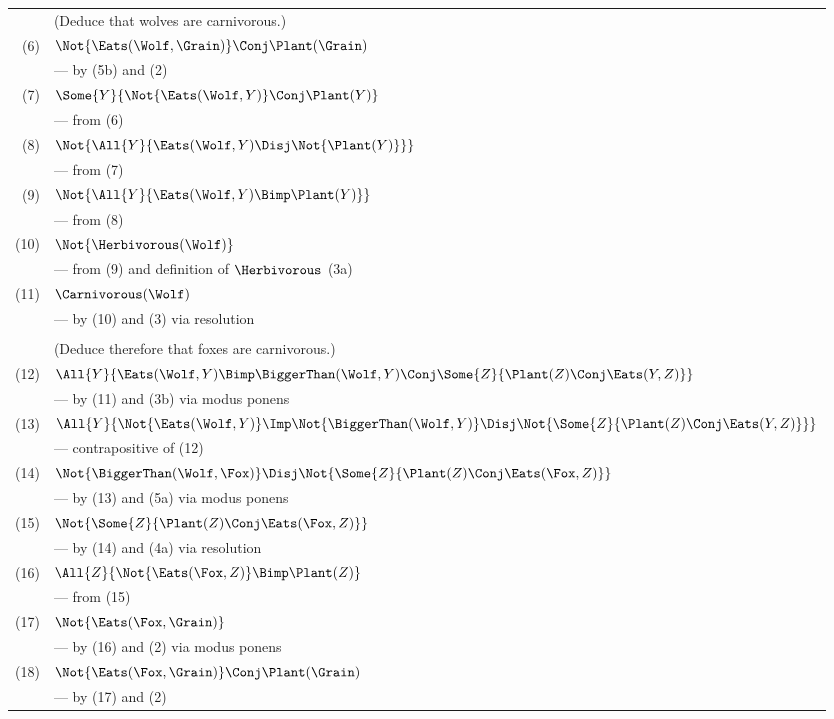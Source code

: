 \begin{itemize}
\begin{tabular}{rl}
& (Deduce that wolves are carnivorous.) \\
(6) & $\Not{\Eats(\Wolf, \Grain)} \Conj \Plant(\Grain)$
\\ & --- by (5b) and (2) \\
(7) & $\Some{Y}{\Not{\Eats(\Wolf, Y)} \Conj \Plant(Y)}$
\\ & --- from (6) \\
(8) & $\Not{\All{Y}{\Eats(\Wolf, Y) \Disj \Not{\Plant(Y)}}}$
\\ & --- from (7) \\
(9) & $\Not{\All{Y}{\Eats(\Wolf, Y) \Bimp \Plant(Y)}}$
\\ & --- from (8) \\
(10) & $\Not{\Herbivorous(\Wolf)}$
\\ & --- from (9) and definition of $\Herbivorous$ (3a) \\
(11) & $\Carnivorous(\Wolf)$
\\ & --- by (10) and (3) via resolution \\
\\
& (Deduce therefore that foxes are carnivorous.) \\
(12) & $\All{Y}{\Eats(\Wolf, Y) \Bimp
            \BiggerThan(\Wolf, Y) \Conj
            \Some{Z}{\Plant(Z) \Conj \Eats(Y, Z)}}$
\\ & --- by (11) and (3b) via modus ponens \\
(13) & $\All{Y}{\Not{\Eats(\Wolf, Y)} \Imp
            \Not{\BiggerThan(\Wolf, Y)} \Disj
            \Not{\Some{Z}{\Plant(Z) \Conj \Eats(Y, Z)}}}$
\\ & --- contrapositive of (12) \\
(14) & $\Not{\BiggerThan(\Wolf, \Fox)} \Disj
            \Not{\Some{Z}{\Plant(Z) \Conj \Eats(\Fox, Z)}}$
\\ & --- by (13) and (5a) via modus ponens \\
(15) & $\Not{\Some{Z}{\Plant(Z) \Conj \Eats(\Fox, Z)}}$
\\ & --- by (14) and (4a) via resolution \\
(16) & $\All{Z}{\Not{\Eats(\Fox, Z)} \Bimp \Plant(Z)}$
\\ & --- from (15) \\
(17) & $\Not{\Eats(\Fox, \Grain)}$
\\ & --- by (16) and (2) via modus ponens \\
(18) & $\Not{\Eats(\Fox, \Grain)} \Conj \Plant(\Grain)$
\\ & --- by (17) and (2) \\

\end{tabular}
\end{itemize}
